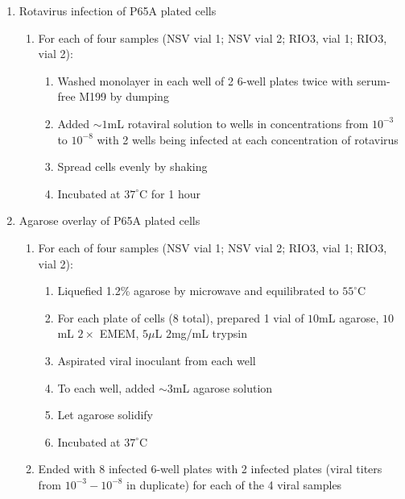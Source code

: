 \begin{enumerate}
	\item Rotavirus infection of P65A plated cells
		\begin{enumerate}
			\item For each of four samples (NSV vial 1; NSV vial 2; RIO3, vial 1; RIO3, vial 2):
				\begin{enumerate}
					\item Washed monolayer in each well of 2 6-well plates twice with serum-free M199 by dumping
					\item Added $\sim 1$mL rotaviral solution to wells in concentrations from $10^{-3}$ to $10^{-8}$ with 2 wells being infected at each concentration of rotavirus
					\item Spread cells evenly by shaking
					\item Incubated at $37^{\circ}$C for 1 hour
				\end{enumerate}
		\end{enumerate}
	\item Agarose overlay of P65A plated cells
		\begin{enumerate}
			\item For each of four samples (NSV vial 1; NSV vial 2; RIO3, vial 1; RIO3, vial 2):
				\begin{enumerate}
					\item Liquefied 1.2\% agarose by microwave and equilibrated to $55^{\circ}$C
					\item For each plate of cells (8 total), prepared 1 vial of $10$mL agarose, $10$mL $2\times$ EMEM, $5\mu$L $2$mg/mL trypsin
					\item Aspirated viral inoculant from each well
					\item To each well, added $\sim3$mL agarose solution
					\item Let agarose solidify
					\item Incubated at $37^{\circ}$C
				\end{enumerate}
			\item Ended with 8 infected 6-well plates with 2 infected plates (viral titers from $10^{-3}-10^{-8}$ in duplicate) for each of the 4 viral samples
		\end{enumerate}
\end{enumerate}